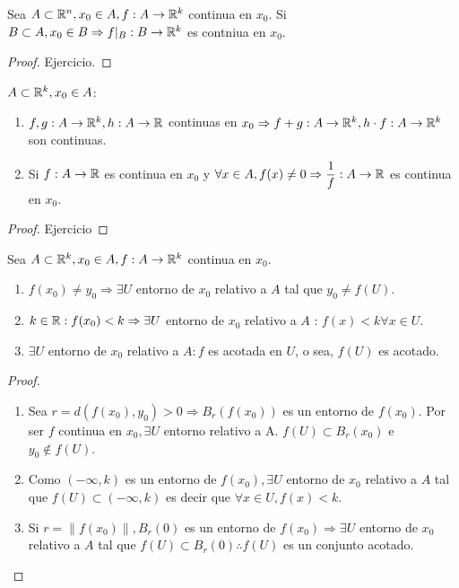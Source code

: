 \begin{prop}
  Sea $A \subset \mathbb{R}^n, x_0 \in A, f: A \to \mathbb{R}^k$ continua en $x_0$. Si $B \subset A, x_0 \in B \Rightarrow f|_B: B \to \mathbb{R}^k$ es contniua en $x_0$.
  \begin{proof}
    Ejercicio.
  \end{proof}
\end{prop}

\clearpage

\begin{prop}
  $A \subset \mathbb{R}^k, x_0 \in A$:
  \begin{enumerate}
    \item $f, g: A \to \mathbb{R}^k, h: A \to \mathbb{R}$ continuas en $x_0 \Rightarrow f+g: A \to \mathbb{R}^k, h \cdot f: A \to \mathbb{R}^k$ son continuas.
    \item Si $f: A \to \mathbb{R}$ es continua en $x_0$ y $\forall x \in A, f(x) \neq 0 \Rightarrow \dfrac{1}{f}: A \to \mathbb{R}$ es continua en $x_0$.
  \end{enumerate}

  \begin{proof}
    Ejercicio
  \end{proof}
\end{prop}

\begin{prop}
  Sea $A \subset \mathbb{R}^k, x_0 \in A, f: A \to \mathbb{R}^k$ continua en $x_0$.
  \begin{enumerate}
    \item $f(x_0) \neq y_0 \Rightarrow \exists U$ entorno de $x_0$ relativo a $A$ tal que $y_0 \neq f(U)$.
    \item $k \in \mathbb{R} : f(x_0) < k \Rightarrow \exists U$ entorno de $x_0$ relativo a $A$ : $f(x) < k \forall x \in U$.
    \item $\exists U$ entorno de $x_0$ relativo a $A : f$ es acotada en $U$, o sea, $f(U)$ es acotado.
  \end{enumerate}

  \begin{proof}
    \begin{enumerate}
      \item Sea $r = d(f(x_0), y_0) > 0 \Rightarrow B_r(f(x_0))$ es un entorno de $f(x_0)$. Por ser $f$ continua en $x_0, \exists U$ entorno relativo a A. $f(U) \subset B_r(x_0)$ e $y_0 \notin f(U)$.
      \item Como $(-\infty, k)$ es un entorno de $f(x_0), \exists U$ entorno de $x_0$ relativo a $A$ tal que $f(U) \subset (-\infty, k)$ es decir que $\forall x \in U, f(x) < k$.
      \item Si $r = \|f(x_0)\|, B_r(0)$ es un entorno de $f(x_0) \Rightarrow \exists U$ entorno de $x_0$ relativo a $A$ tal que $f(U) \subset B_r(0) \therefore f(U)$ es un conjunto acotado.
    \end{enumerate}
  \end{proof}
\end{prop}

